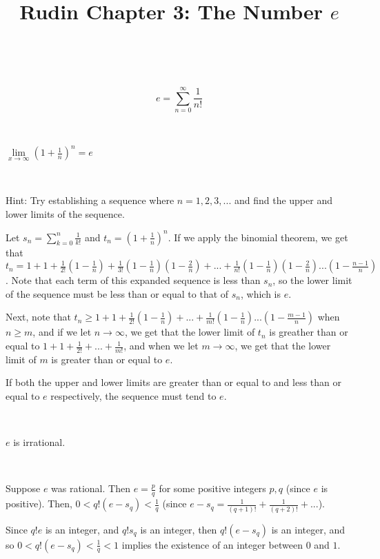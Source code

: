 \documentclass{article}
\title{Rudin Chapter 3: The Number $e$}
\begin{document}
\maketitle

\begin{definition}
\

$$e = \sum_{n=0}^\infty \frac{1}{n!}$$
\end{definition}


\begin{theorem}
\

$\underset{x \to \infty}{\lim} (1 + \frac{1}{n})^n = e$
\end{theorem}

\begin{customproof}
\

Hint: Try establishing a sequence where $n = 1, 2, 3, ...$ and find the upper and lower limits of the sequence.

Let $s_n = \sum_{k=0}^n \frac{1}{k!}$ and $t_n = (1+\frac{1}{n})^n$. If we apply the binomial theorem, we get that $t_n = 1 + 1 + \frac{1}{2!}(1- \frac{1}{n}) + \frac{1}{3!}(1 - \frac{1}{n})(1-\frac{2}{n}) + ... + \frac{1}{n!} (1-\frac{1}{n})(1-\frac{2}{n})...(1-\frac{n-1}{n})$. Note that each term of this expanded sequence is less than $s_n$, so the lower limit of the sequence must be less than or equal to that of $s_n$, which is $e$. 

Next, note that $t_n \geq 1 + 1 + \frac{1}{2!}(1-\frac{1}{n}) + ... + \frac{1}{m!}(1-\frac{1}{n})...(1 - \frac{m-1}{n})$ when $n \geq m$, and if we let $n \to \infty$, we get that the lower limit of $t_n$ is greather than or equal to $1 + 1 + \frac{1}{2!} + ... + \frac{1}{m!}$, and when we let $m \to \infty$, we get that the lower limit of $m$ is greater than or equal to $e$.

If both the upper and lower limits are greater than or equal to and less than or equal to $e$ respectively, the sequence must tend to $e$.
\end{customproof}

\begin{theorem}
\

$e$ is irrational.
\end{theorem}

\begin{customproof}
\

Suppose $e$ was rational. Then $e = \frac{p}{q}$ for some positive integers $p,q$ (since $e$ is positive). Then, $0 < q!(e-s_q) < \frac{1}{q}$ (since $e-s_q = \frac{1}{(q+1)!} + \frac{1}{(q+2)!} + ... $).

Since $q!e$ is an integer, and $q!s_q$ is an integer, then $q!(e-s_q)$ is an integer, and so $0 < q!(e-s_q) < \frac{1}{q} < 1$ implies the existence of an integer between $0$ and $1$.
\end{customproof}
\end{document}
